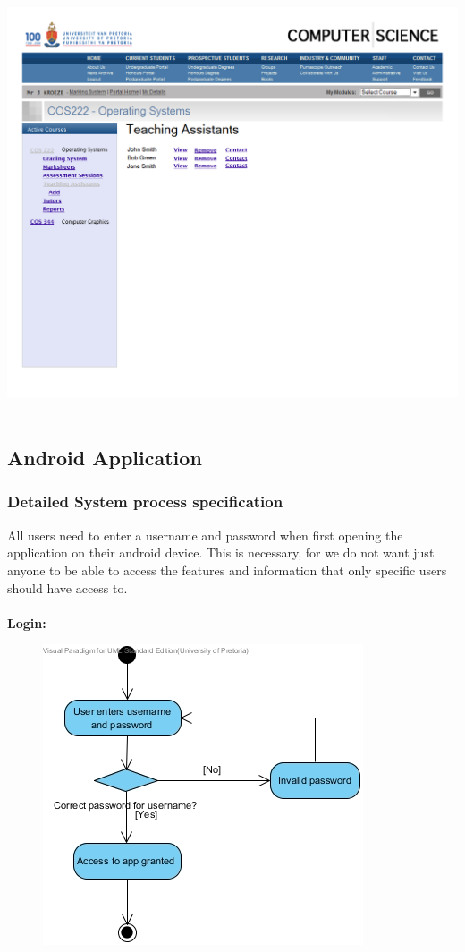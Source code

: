 \documentclass[12pt,a4paper]{article}
\begin{document}
\includegraphics[scale=0.3]{./WebUI/13.png}\\\\
\pagebreak
\subsection{Android Application}
\subsubsection{Detailed System process specification}
All users need to enter a username and password when first opening the application on their android device.  This is necessary, for we do not want just anyone to be able to access the features and information that only specific users should have access to.\\\\
\textbf {Login:}
\begin{figure}[h]
\begin{center}
\includegraphics[scale=0.7]{./AndroidActivityDiagrams/ActivityDiagram1.jpg}
\end{center}
\end{figure}
\end{document}
